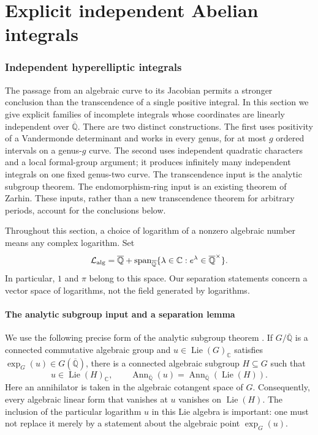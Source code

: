 \documentclass[11pt,a4paper]{article}
\theoremstyle{definition}
\theoremstyle{remark}
\numberwithin{equation}{section}
\newcommand{\Qbar}{\overline{\mathbb Q}}
\begin{document}
\part{Explicit independent Abelian integrals}

\section{Independent hyperelliptic integrals}
\label{ii-sec-integrals}

The passage from an algebraic curve to its Jacobian permits a stronger
conclusion than the transcendence of a single positive integral.  In this
section we give explicit families of incomplete integrals whose coordinates
are linearly independent over $\Qbar$.  There are two distinct constructions.
The first uses positivity of a Vandermonde determinant and works in every
genus, for at most $g$ ordered intervals on a genus-$g$ curve.  The second
uses independent quadratic characters and a local formal-group argument; it
produces infinitely many independent integrals on one fixed genus-two
curve.  The transcendence input is the analytic subgroup theorem.  The
endomorphism-ring input is an existing theorem of Zarhin.  These inputs,
rather than a new transcendence theorem for arbitrary periods, account for
the conclusions below.

Throughout this section, a choice of logarithm of a nonzero algebraic
number means any complex logarithm.  Set
\begin{equation}\label{ii-eq-log-space}
 \mathcal L_{\rm alg}
 =\Qbar+
   \operatorname{span}_{\Qbar}
       \{\lambda\in\mathbb C:e^\lambda\in\Qbar^{\times}\}.
\end{equation}
In particular, $1$ and $\pi$ belong to this space.  Our separation statements
concern a vector space of logarithms, not the field generated by logarithms.

\subsection{The analytic subgroup input and a separation lemma}

We use the following precise form of the analytic subgroup theorem
\cite[Theorem~6.2]{lm-HuberWustholz}.  If $G/\Qbar$ is a connected
commutative algebraic group and $u\in\operatorname{Lie}(G)_{\mathbb C}$
satisfies $\exp_G(u)\in G(\Qbar)$, there is a connected algebraic subgroup
$H\subseteq G$ such that
\[
 u\in\operatorname{Lie}(H)_{\mathbb C},\qquad
 \operatorname{Ann}_{\Qbar}(u)
   =\operatorname{Ann}_{\Qbar}(\operatorname{Lie}(H)).
\]
Here an annihilator is taken in the algebraic cotangent space of $G$.
Consequently, every algebraic linear form that vanishes at $u$ vanishes
on $\operatorname{Lie}(H)$.  The inclusion of the particular logarithm $u$
in this Lie algebra is important: one must not replace it merely by a
statement about the algebraic point $\exp_G(u)$.
\end{document}
